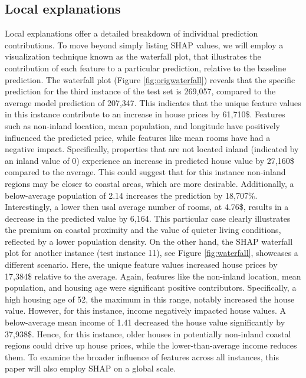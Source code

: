 \documentclass[12pt]{article}
\begin{document}
\subsection{Local explanations}
Local explanations offer a detailed breakdown of individual prediction contributions.
To move beyond simply listing SHAP values, we will employ a visualization technique known as the waterfall plot, that illustrates the contribution of each feature to a particular prediction, relative to the baseline prediction.
The waterfall plot (Figure \ref{fig:origwaterfall}) reveals that the specific prediction for the third instance of the test set is 269,057, compared to the average model prediction of 207,347. This indicates that the unique feature values in this instance contribute to an increase in house prices by 61,710\$.
 Features such as non-inland location, mean population, and longitude have positively influenced the predicted price, while features like mean rooms have had a negative impact. 
Specifically, properties that are not located inland (indicated by an inland value of 0) experience an increase in predicted house value by 27,160\$ compared to the average. This could suggest that for this instance non-inland regions may be closer to coastal areas, which are more desirable.
Additionally, a below-average population of 2.14 increases the prediction by 18,707\%.
Interestingly, a lower then usal average number of rooms, at 4.76\$, results in a decrease in  the predicted value by 6,164. This particular case clearly illustrates the premium on coastal proximity and the value of quieter living conditions, reflected by a lower population density.
On the other hand, the SHAP waterfall plot for another instance (test instance 11), see Figure \ref{fig:waterfall}, showcases a different scenario. Here, the unique feature values increased house prices by 17,384\$ relative to the average. 
Again, features like the non-inland location, mean population, and housing age were significant positive contributors. Specifically, a high housing age of 52, the maximum in this range, notably increased the house value. 
However, for this instance, income negatively impacted house values. A below-average mean income of 1.41 decreased the house value significantly by 37,938\$. Hence, for this instance, older houses in potentially non-inland coastal regions could drive up house prices, while the lower-than-average income reduces them. To examine the broader influence of features across all instances, this paper will also employ SHAP on a global scale.
\end{document}
